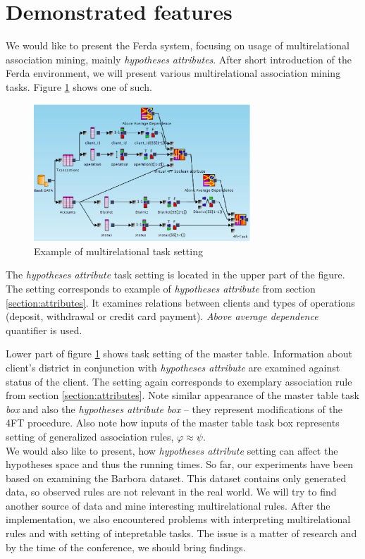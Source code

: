 \documentclass[conference]{IEEEtran}
\begin{document}
\section{Demonstrated features}
\label{section:features}

We would like to present the Ferda system, focusing on usage of multirelational 
association mining, mainly \emph{hypotheses attributes}. After short introduction 
of the Ferda environment, we will present various multirelational association
mining tasks. Figure \ref{fig:example} shows one of such. 

\begin{figure}[!t]
\centering
\includegraphics[width=3.2in]{Example.eps}
\caption{Example of multirelational task setting}
\label{fig:example}
\end{figure}

The \emph{hypotheses attribute} task setting is located in the upper part of the 
figure. The setting corresponds to example of \emph{hypotheses attribute} from section 
\ref{section:attributes}. It examines relations between clients and types of operations (deposit, withdrawal or credit card payment). \emph{Above average dependence} quantifier
is used. 

Lower part of figure \ref{fig:example} shows task setting of the master table. Information
about client's district in conjunction with \emph{hypotheses attribute} are examined 
against status of the client. The setting again corresponds to exemplary association 
rule from section \ref{section:attributes}. Note similar appearance of the master 
table task \emph{box} and also the \emph{hypotheses attribute box} -- they represent 
modifications of the 4FT procedure. Also note how inputs of the master table task 
box represents setting of generalized association rules, \mbox{$\varphi \approx \psi$}.
$$$$
We would also like to present, how \emph{hypotheses attribute} setting can affect
the hypotheses space and thus the running times. So far, our experiments have been
based on examining the Barbora dataset. This dataset contains only generated data, 
so observed rules are not relevant in the real world. We will try to find another
source of data and mine interesting multirelational rules. After the implementation,
we also encountered problems with interpreting multirelational rules and with 
setting of intepretable tasks. The issue is a matter of research and by the time 
of the conference, we should bring findings. 
\end{document}
